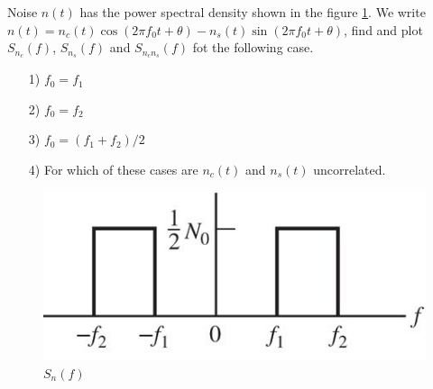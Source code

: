 \documentclass{assignment}
\begin{document}
\begin{prob}
    Noise $n(t)$ has the power spectral density shown in the figure \ref{figure1}. We write $n(t)=n_c(t)\cos(2\pi f_0t+\theta)-n_s(t)\sin(2\pi f_0t+\theta)$, find and plot $S_{n_c}(f)$, $S_{n_s}(f)$ and $S_{n_cn_s}(f)$ fot the following case.
    \begin{itemize}
        \item[1)] $f_0=f_1$
        \item[2)] $f_0=f_2$
        \item[3)] $f_0=(f_1+f_2)/2$
        \item[4)] For which of these cases are $n_c(t)$ and $n_s(t)$ uncorrelated.
    \end{itemize}
    \begin{figure}[h]
        \centering
        \includegraphics[width=.5\textwidth]{Figure1.jpg}
        \caption{$S_n(f)$}\label{figure1}
    \end{figure}
\end{prob}
\begin{sol}
    
\end{sol}
\end{document}
